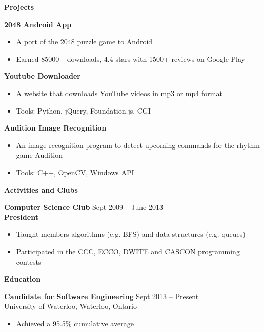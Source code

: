 \documentclass{letter}
\begin{document}
{\bfseries \Large Projects}

\vspace{-1.5mm}
{\bfseries 2048 Android App}
\vspace{-3mm}
\begin{itemize}
    \item A port of the 2048 puzzle game to Android
    \item Earned 85000+ downloads, 4.4 stars with 1500+ reviews on Google Play
\end{itemize}
\vspace{-3mm}
{\bfseries Youtube Downloader}
\vspace{-3mm}
\begin{itemize}
    \item A website that downloads YouTube videos in mp3 or mp4 format
    \item Tools: Python, jQuery, Foundation.js, CGI
\end{itemize}
\vspace{-3mm}
{\bfseries Audition Image Recognition}
\vspace{-3mm}
\begin{itemize}
    \item An image recognition program to detect upcoming commands for the rhythm game Audition
    \item Tools: C++, OpenCV, Windows API
\end{itemize}

{\bfseries \Large Activities and Clubs}

\vspace{-1.5mm}
{\bfseries Computer Science Club} \hfill Sept 2009 -- June 2013 \\
{\bfseries President}
\vspace{-3mm}
\begin{itemize}
  \item Taught members algorithms (e.g. BFS) and data structures (e.g. queues)
  \item Participated in the CCC, ECCO, DWITE and CASCON programming contests
\end{itemize}

{\bfseries \Large Education}

\vspace{-1.5mm}
{\bfseries Candidate for Software Engineering} \hfill Sept 2013 -- Present \\
University of Waterloo, Waterloo, Ontario
\vspace{-3mm}
\begin{itemize}
    \item Achieved a 95.5\% cumulative average
\end{itemize}
\end{document}
